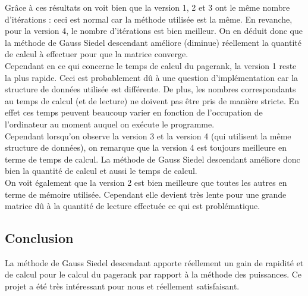 \documentclass[10pt,a4paper]{article}
\begin{document}
Grâce à ces résultats on voit bien que la version 1, 2 et 3 ont le même nombre d'itérations : ceci est normal car la méthode utilisée est la même. En revanche, pour la version 4, le nombre d'itérations est bien meilleur. On en déduit donc que la méthode de Gauss Siedel descendant améliore (diminue) réellement la quantité de calcul à effectuer pour que la matrice converge. \\
Cependant en ce qui concerne le temps de calcul du pagerank, la version 1 reste la plus rapide. Ceci est probablement dû à une question d'implémentation car la structure de données utilisée est différente. De plus, les nombres correspondants au temps de calcul (et de lecture) ne doivent pas être pris de manière stricte. En effet ces temps peuvent beaucoup varier en fonction de l'occupation de l'ordinateur au moment auquel on exécute le programme. \\
Cependant lorsqu'on observe la version 3 et la version 4 (qui utilisent la même structure de données), on remarque que la version 4 est toujours meilleure en terme de temps de calcul. La méthode de Gauss Siedel descendant améliore donc bien la quantité de calcul et aussi le temps de calcul. \\
On voit également que la version 2 est bien meilleure que toutes les autres en terme de mémoire utilisée. Cependant elle devient très lente  pour une grande matrice dû à la quantité de lecture effectuée ce qui est problématique. \\

\subsection{Conclusion}
La méthode de Gauss Siedel descendant apporte réellement un gain de rapidité et de calcul pour le calcul du pagerank par rapport à la méthode des puissances. Ce projet a été très intéressant pour nous et réellement satisfaisant.
\end{document}
